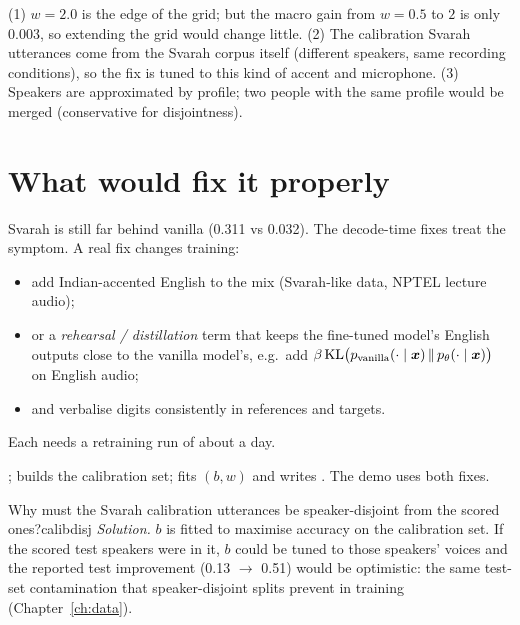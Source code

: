 \begin{vivatip}
(1) $w=2.0$ is the edge of the grid; but the macro gain from $w=0.5$ to $2$ is only 0.003, so extending the grid would change little.
(2) The calibration Svarah utterances come from the Svarah corpus itself (different speakers, same recording conditions), so the
fix is tuned to this kind of accent and microphone. (3) Speakers are approximated by profile; two people with the same profile would
be merged (conservative for disjointness).
\end{vivatip}

\section{What would fix it properly}

Svarah is still far behind vanilla (0.311 vs 0.032). The decode-time fixes treat the symptom. A real fix changes training:
\begin{itemize}
\item add Indian-accented English to the mix (Svarah-like data, NPTEL lecture audio);
\item or a \emph{rehearsal / distillation} term that keeps the fine-tuned model's English outputs close to the vanilla model's, e.g.\
add $\beta\,\mathrm{KL}\big(p_{\text{vanilla}}(\cdot\mid\bm{x})\,\|\,p_\theta(\cdot\mid\bm{x})\big)$ on English audio;
\item and verbalise digits consistently in references and targets.
\end{itemize}
Each needs a retraining run of about a day.

\begin{incode}
;  builds the calibration set;
\file{lid_calib.py} fits $(b,w)$ and writes \file{lid_rule.json}. The demo uses both fixes.
\end{incode}

\begin{exercise}{Why must the Svarah calibration utterances be speaker-disjoint from the scored ones?}{calibdisj}
\textit{Solution.} $b$ is fitted to maximise accuracy on the calibration set. If the scored test speakers were in it, $b$ could be
tuned to those speakers' voices and the reported test improvement (0.13 $\to$ 0.51) would be optimistic: the same test-set
contamination that speaker-disjoint splits prevent in training (Chapter~\ref{ch:data}).
\end{exercise}
